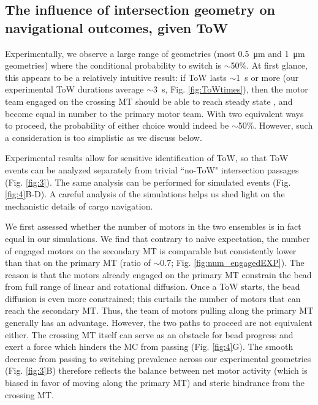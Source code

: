 \subsection{The influence of intersection geometry on navigational outcomes, given ToW}

Experimentally, we observe a large range of geometries (most \SI{.5}{\micro\meter} and \SI{1}{\micro\meter} geometries) where the conditional probability to switch is $\sim$50\%. At first glance, this appears to be a relatively intuitive result: if ToW lasts $\sim$\SI{1}{\second} or more (our experimental ToW durations average $\sim$\SI{3}{\second}, Fig. \ref{fig:ToWtimes}), then the motor team engaged on the crossing MT should be able to reach steady state \cite{Erickson2011}, and become equal in number to the primary motor team. With two equivalent ways to proceed, the probability of either choice would indeed be $\sim$50\%. However, such a consideration is too simplistic as we discuss below.

Experimental results allow for sensitive identification of ToW, so that ToW events can be analyzed separately from trivial ``no-ToW" intersection passages (Fig. \ref{fig:3}). The same analysis can be performed for simulated events (Fig. \ref{fig:4}B-D). A careful analysis of the simulations helps us shed light on the mechanistic details of cargo navigation.

We first assessed whether the number of motors in the two ensembles is in fact equal in our simulations. We find that contrary to na\"ive expectation, the number of engaged motors on the secondary MT is comparable but consistently lower than that on the primary MT (ratio of $\sim$0.7; Fig. \ref{fig:num_engagedEXP}). The reason is that the motors already engaged on the primary MT constrain the bead from full range of linear and rotational diffusion. Once a ToW starts, the bead diffusion is even more constrained; this curtails the number of motors that can reach the secondary MT. Thus, the team of motors pulling along the primary MT generally has an advantage. However, the two paths to proceed are not equivalent either. The crossing MT itself can serve as an obstacle for bead progress and exert a force which hinders the MC from passing (Fig. \ref{fig:4}G). The smooth decrease from passing to switching prevalence across our experimental geometries (Fig. \ref{fig:3}B) therefore reflects the balance between net motor activity (which is biased in favor of moving along the primary MT) and steric hindrance from the crossing MT.

